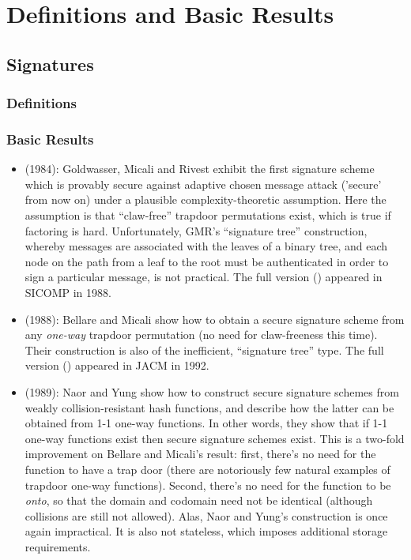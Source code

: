\chapter{Definitions and Basic Results}

\section{Signatures}
\subsection{Definitions}
\subsection{Basic Results}
\begin{itemize}

\item \cite{goldwasser:signatures1} (1984): Goldwasser, Micali and Rivest
exhibit the first signature scheme which is provably secure against adaptive
chosen message attack ('secure' from now on) under a plausible complexity-theoretic assumption. Here the
assumption is that ``claw-free'' trapdoor permutations exist, which is true if
factoring is hard. Unfortunately, GMR's ``signature tree'' construction,
whereby messages are associated with the leaves of a binary tree, and each node on
the path from a leaf to the root must be authenticated in order to sign a
particular message, is not practical. The full version (\cite{goldwasser:signatures2}) appeared in SICOMP
in 1988.

\item \cite{bellare:trapdoorsigs1} (1988): Bellare and Micali show how to
obtain a secure signature scheme from any \emph{one-way} trapdoor permutation
(no need for claw-freeness this time). Their construction is also
of the inefficient, ``signature tree'' type. The full version (\cite{bellare:trapdoorsigs2}) 
appeared in JACM in 1992. 

\item \cite{naor:universal} (1989): Naor and Yung show how to construct
secure signature schemes from weakly collision-resistant hash
functions, and describe how the latter can be obtained from 1-1 one-way
functions. In other words, they show that if 1-1 one-way functions exist then
secure signature schemes exist. This is a two-fold improvement on Bellare and
Micali's result: first, there's no need for the function to have a trap door
(there are notoriously few natural examples of trapdoor one-way functions).
Second, there's no need for the function to be \emph{onto}, so that the domain
and codomain need not be identical (although collisions are still not
allowed). Alas, Naor and Yung's construction is once again impractical. It is
also not stateless, which imposes additional storage requirements.


\end{itemize}
